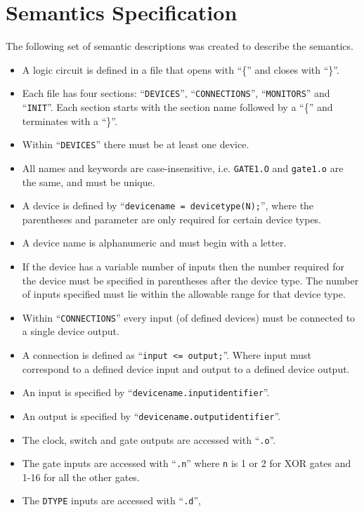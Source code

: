 \documentclass[a4paper,11pt]{article}  %
\begin{document}
\section{Semantics Specification}

The following set of semantic descriptions was created to describe the
semantics.
\begin{itemize}
  \item A logic circuit is defined in a file that opens with ``\{'' and
      closes with ``\}''.
  \item Each file has four sections: ``\texttt{DEVICES}'',
    ``\texttt{CONNECTIONS}'', ``\texttt{MONITORS}'' and
    ``\texttt{INIT}''. Each section starts with the section name
    followed by a ``\{'' and terminates with a ``\}''.
  \item Within ``\texttt{DEVICES}'' there must be at least one
    device.
 \item All names and keywords are case-insensitive,
   i.e. \texttt{GATE1.O} and \texttt{gate1.o} are the same, and must
   be unique. 
  \item A device is defined by ``\texttt{devicename =
      devicetype(N);}'', where the parentheses and parameter are only
    required for certain device types.
  \item A device name is alphanumeric and must begin with a letter.
  \item If the device has a variable number of inputs then the number
    required for the device must be specified in parentheses after the
    device type. The number of inputs specified must lie within the
    allowable range for that device type.
  \item Within ``\texttt{CONNECTIONS}'' every input (of defined
    devices) must be connected to a single device output.
  \item A connection is defined as ``\texttt{input <=
      output;}''. Where input must correspond to a defined device
    input and output to a defined device output.
  \item An input is specified by
    ``\texttt{devicename.inputidentifier}''.
  \item An output is specified by
    ``\texttt{devicename.outputidentifier}''.
  \item The clock, switch and gate outputs are accessed with
    ``\texttt{.o}''.
  \item The gate inputs are accessed with ``\texttt{.n}'' where
    \texttt{n} is 1 or 2 for XOR gates and 1-16 for all the other
    gates.
  \item The \texttt{DTYPE} inputs are accessed with ``\texttt{.d}'',

\end{itemize}
\end{document}
